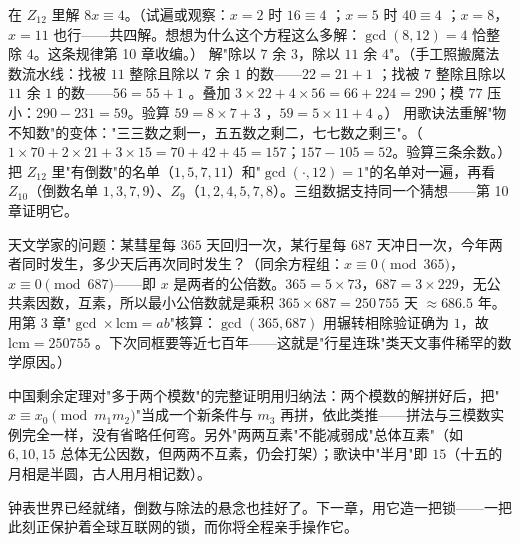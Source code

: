 \begin{dongshou}
\begin{itemize}
  \yisi 在 $Z_{12}$ 里解 $8x \equiv 4$。（试遍或观察：$x = 2$ 时 $16\equiv4$ \checkmark；$x = 5$ 时 $40\equiv4$ \checkmark；$x = 8$，$x = 11$ 也行——共四解。想想为什么这个方程这么多解：$\gcd(8,12) = 4$ 恰整除 $4$。这条规律第 10 章收编。）
  \yier 解"除以 $7$ 余 $3$，除以 $11$ 余 $4$"。（手工照搬魔法数流水线：找被 $11$ 整除且除以 $7$ 余 $1$ 的数——$22 = 21+1$ \checkmark；找被 $7$ 整除且除以 $11$ 余 $1$ 的数——$56 = 55+1$ \checkmark。叠加 $3\times22 + 4\times56 = 66+224 = 290$；模 $77$ 压小：$290 - 231 = 59$。验算 $59 = 8\times7+3$ \checkmark，$59 = 5\times11+4$ \checkmark。）
  \yier 用歌诀法重解"物不知数"的变体："三三数之剩一，五五数之剩二，七七数之剩三"。（$1\times70 + 2\times21 + 3\times15 = 70+42+45 = 157$；$157 - 105 = 52$。验算三条余数。）
  \yier 把 $Z_{12}$ 里"有倒数"的名单（$1,5,7,11$）和"$\gcd(\cdot, 12) = 1$"的名单对一遍，再看 $Z_{10}$（倒数名单 $1,3,7,9$）、$Z_9$（$1,2,4,5,7,8$）。三组数据支持同一个猜想——第 10 章证明它。
\end{itemize}
\end{dongshou}

\begin{shaonao}
天文学家的问题：某彗星每 $365$ 天回归一次，某行星每 $687$ 天冲日一次，今年两者同时发生，多少天后再次同时发生？（同余方程组：$x \equiv 0 \pmod{365}$，$x \equiv 0 \pmod{687}$——即 $x$ 是两者的公倍数。$365 = 5\times73$，$687 = 3\times229$，无公共素因数，互素，所以最小公倍数就是乘积 $365\times687 = 250\,755$ 天 $\approx 686.5$ 年。用第 3 章"$\gcd \times \mathrm{lcm} = ab$"核算：$\gcd(365,687)$ 用辗转相除验证确为 $1$，故 $\mathrm{lcm} = 250755$ \checkmark。下次同框要等近七百年——这就是"行星连珠"类天文事件稀罕的数学原因。）
\end{shaonao}

\begin{chengshi}
中国剩余定理对"多于两个模数"的完整证明用归纳法：两个模数的解拼好后，把"$x \equiv x_0 \pmod{m_1m_2}$"当成一个新条件与 $m_3$ 再拼，依此类推——拼法与三模数实例完全一样，没有省略任何弯。另外"两两互素"不能减弱成"总体互素"（如 $6, 10, 15$ 总体无公因数，但两两不互素，仍会打架）；歌诀中"半月"即 $15$（十五的月相是半圆，古人用月相记数）。
\end{chengshi}

钟表世界已经就绪，倒数与除法的悬念也挂好了。下一章，用它造一把锁——一把此刻正保护着全球互联网的锁，而你将全程亲手操作它。
